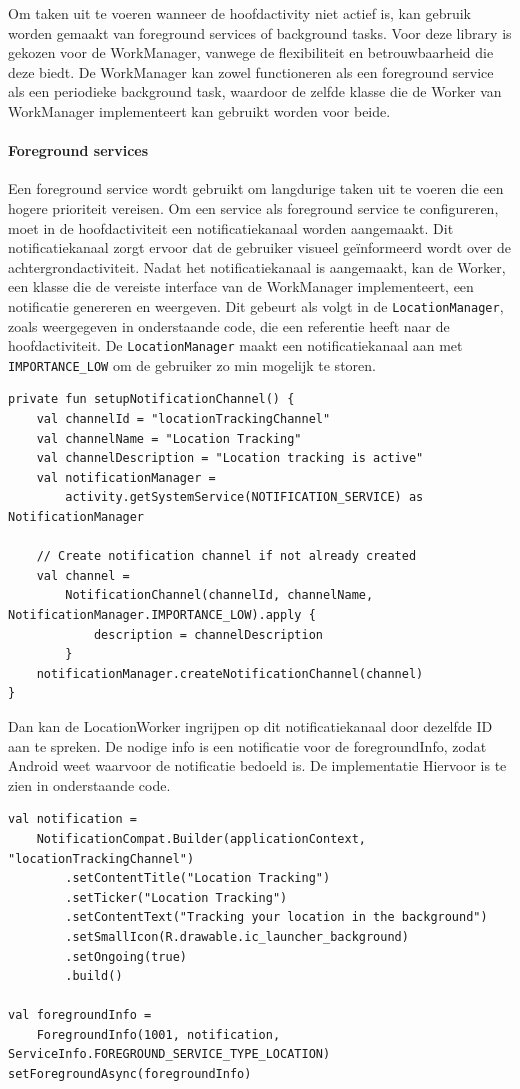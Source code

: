 Om taken uit te voeren wanneer de hoofdactivity niet actief is, kan gebruik worden gemaakt van foreground services of background tasks. Voor deze library is gekozen voor de WorkManager, vanwege de flexibiliteit en betrouwbaarheid die deze biedt. De WorkManager kan zowel functioneren als een foreground service als een periodieke background task, waardoor de zelfde klasse die de Worker van WorkManager implementeert kan gebruikt worden voor beide.

\paragraph{Foreground services}
Een foreground service wordt gebruikt om langdurige taken uit te voeren die een hogere prioriteit vereisen. Om een service als foreground service te configureren, moet in de hoofdactiviteit een notificatiekanaal worden aangemaakt. Dit notificatiekanaal zorgt ervoor dat de gebruiker visueel geïnformeerd wordt over de achtergrondactiviteit. 
Nadat het notificatiekanaal is aangemaakt, kan de Worker, een klasse die de vereiste interface van de WorkManager implementeert, een notificatie genereren en weergeven.
Dit gebeurt als volgt in de \texttt{LocationManager}, zoals weergegeven in onderstaande code, die een referentie heeft naar de hoofdactiviteit. De \texttt{LocationManager} maakt een notificatiekanaal aan met \texttt{IMPORTANCE\_LOW} om de gebruiker zo min mogelijk te storen.
\begin{verbatim}
private fun setupNotificationChannel() {
    val channelId = "locationTrackingChannel"
    val channelName = "Location Tracking"
    val channelDescription = "Location tracking is active"
    val notificationManager =
        activity.getSystemService(NOTIFICATION_SERVICE) as NotificationManager

    // Create notification channel if not already created
    val channel =
        NotificationChannel(channelId, channelName, NotificationManager.IMPORTANCE_LOW).apply {
            description = channelDescription
        }
    notificationManager.createNotificationChannel(channel)
}
\end{verbatim}
Dan kan de LocationWorker ingrijpen op dit notificatiekanaal door dezelfde ID aan te spreken. De nodige info is een notificatie voor de foregroundInfo, zodat Android weet waarvoor de notificatie bedoeld is. De implementatie Hiervoor is te zien in onderstaande code.
\begin{verbatim}
val notification =
    NotificationCompat.Builder(applicationContext, "locationTrackingChannel")
        .setContentTitle("Location Tracking")
        .setTicker("Location Tracking")
        .setContentText("Tracking your location in the background")
        .setSmallIcon(R.drawable.ic_launcher_background)
        .setOngoing(true)
        .build()

val foregroundInfo =
    ForegroundInfo(1001, notification, ServiceInfo.FOREGROUND_SERVICE_TYPE_LOCATION)
setForegroundAsync(foregroundInfo)
\end{verbatim}

